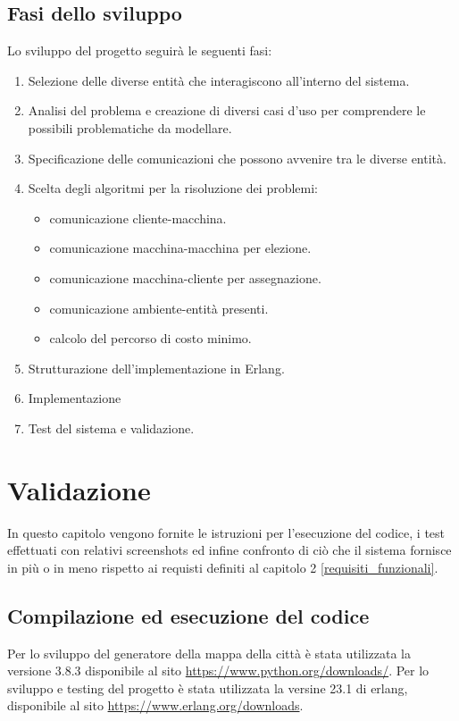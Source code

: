 \section{Fasi dello sviluppo}
Lo sviluppo del progetto seguirà le seguenti fasi:
\begin{enumerate}
	\item Selezione delle diverse entità che interagiscono all'interno del sistema.
	\item Analisi del problema e creazione di diversi casi d'uso per comprendere le possibili problematiche da modellare.
	\item Specificazione delle comunicazioni che possono avvenire tra le diverse entità.
	\item Scelta degli algoritmi per la risoluzione dei problemi: 
		\begin{itemize}
			\item comunicazione cliente-macchina.
			\item comunicazione macchina-macchina per elezione.
			\item comunicazione macchina-cliente per assegnazione.
			\item comunicazione ambiente-entità presenti.
			\item calcolo del percorso di costo minimo.
		\end{itemize}
	\item Strutturazione dell'implementazione in Erlang.
	\item Implementazione
	\item Test del sistema e validazione.
\end{enumerate}

\chapter{Validazione}

In questo capitolo vengono fornite le istruzioni per l'esecuzione del codice, i test effettuati con relativi screenshots ed infine confronto di ciò che il sistema fornisce in più o in meno rispetto ai requisti definiti al capitolo 2 \ref{requisiti_funzionali}.

\section{Compilazione ed esecuzione del codice}
Per lo sviluppo del generatore della mappa della città è stata utilizzata la versione 3.8.3 disponibile al sito \url{https://www.python.org/downloads/}.
Per lo sviluppo e testing del progetto è stata utilizzata la versine 23.1 di erlang, disponibile al sito \url{https://www.erlang.org/downloads}.

